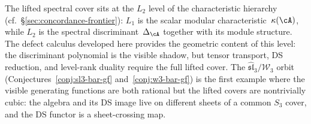 \begin{remark}
\label{rem:spectral-shadow-position}
The lifted spectral cover sits at the $L_2$ level of the
characteristic hierarchy
(cf.~\S\ref{sec:concordance-frontier}): $L_1$ is the scalar
modular characteristic~$\kappa(\cA)$, while $L_2$ is the
spectral discriminant~$\Delta_\cA$ together with its module
structure.  The defect calculus developed here provides the
geometric content of this level: the discriminant polynomial is
the visible shadow, but tensor transport, DS reduction, and
level-rank duality require the full lifted cover.
The $\widehat{\mathfrak{sl}}_3/\mathcal{W}_3$ orbit
(Conjectures~\ref{conj:sl3-bar-gf}
and~\ref{conj:w3-bar-gf}) is the first example where the
visible generating functions are both rational but the lifted
covers are nontrivially cubic: the algebra and its DS image
live on different sheets of a common $S_3$ cover, and the DS
functor is a sheet-crossing map.
\end{remark}

